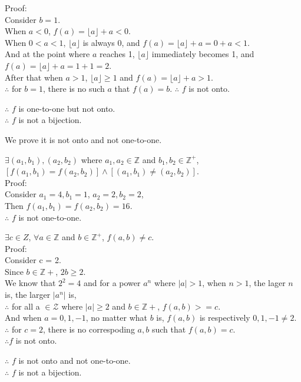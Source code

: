 \documentclass[12pt]{exam}
\begin{document}
\begin{solution}
\begin{qparts}
\begin{subparts}
            Proof:\\
            Consider $b = 1$.\\
            When $a < 0$, $f(a) = \lfloor a \rfloor + a < 0$.\\
            When $0 < a < 1$, $\lfloor a \rfloor$ is always $0$, and $f(a) = \lfloor a \rfloor + a = 0 + a <1$.\\
            And at the point where $a$ reaches 1, $\lfloor a \rfloor$ immediately becomes 1, and $f(a) = \lfloor a \rfloor + a = 1 + 1 = 2$.\\
            After that when $a > 1$, $\lfloor a \rfloor \geq 1$ and $f(a) = \lfloor a \rfloor + a >1$.\\
            $\therefore$ for $b = 1$, there is no such $a$ that $f(a) = b$.
            $\therefore$ $f$ is not onto.
        \end{subparts}
        $\therefore$ $f$ is one-to-one but not onto.\\
        $\therefore$ $f$ is not a bijection.
        \item
        We prove it is not onto and not one-to-one.
        \begin{subparts}
            \item
            $\exists (a_1, b_1), (a_2, b_2)$ where $a_1, a_2 \in \mathbb{Z}$ 
            and $b_1, b_2\in\mathbb{Z^+}$, $[f(a_1, b_1) = f(a_2, b_2)] \land [(a_1,b_1) \not = (a_2, b_2)]$.\\
            Proof:\\
            Consider $a_1 = 4, b_1 =1$, $a_2 = 2, b_2 = 2$,\\
            Then $f(a_1,b_1) = f(a_2, b_2) = 16$.\\
            $\therefore$ $f$ is not one-to-one.
            \item
            $\exists c\in Z$, $\forall a \in \mathbb{Z}$ and $b \in \mathbb{Z^+}$, $f(a,b) \not = c$.\\
            Proof:\\
            Consider c = 2.\\
            Since $b \in \mathbb{Z+}$, $2b \geq 2$.\\
            We know that $2^2 = 4$
            and for a power $a^n$ where $|a| > 1$, when $n > 1$, the lager $n$ is, the larger $|a^n|$ is,\\
            $\therefore$ for all a $\in \mathcal{Z}$ where $|a| \geq 2$ and $b \in \mathbb{Z+}$, $f(a,b) > = c$.\\
            And when $a = 0, 1, -1$, no matter what $b$ is, $f(a,b)$ is respectively $0,1,-1 \not = 2$.\\
            $\therefore$ for $c =2$, there is no correspoding $a,b$ such that $f(a,b) = c$.\\
            $\therefore f$ is not onto.
        \end{subparts}
        $\therefore$ $f$ is not onto and not one-to-one.\\
        $\therefore$ $f$ is not a bijection.
    \end{qparts}

\end{solution}
\end{document}
